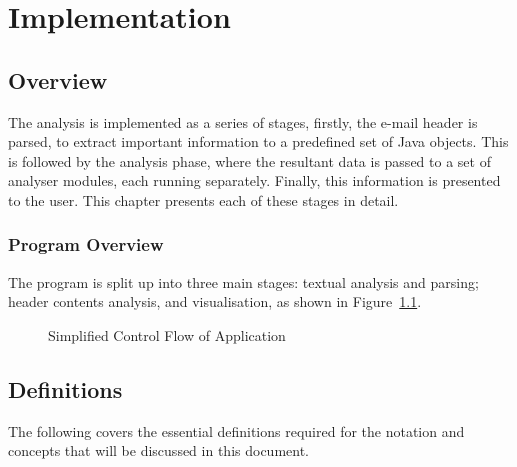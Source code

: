 \chapter{Implementation}\label{chap:imp}
\section{Overview}

The  analysis is implemented as a series of stages, firstly, the e-mail header
is parsed, to extract important information to a predefined set of Java objects.
This is followed by the analysis phase, where the resultant data is passed to a
set of analyser modules, each running separately.  Finally, this information is
presented to the user.  This chapter presents each of these stages in detail.

\subsection{Program Overview}

The program is split up into three main stages: textual analysis and parsing; header contents analysis, and visualisation, as shown in Figure~\ref{fig:con}.

\begin{figure}
	\centering
{}
\caption{Simplified Control Flow of Application}
\label{fig:con}
\end{figure}

\section{Definitions}

The following covers the essential definitions required for the notation and
concepts that will be discussed in this document.

